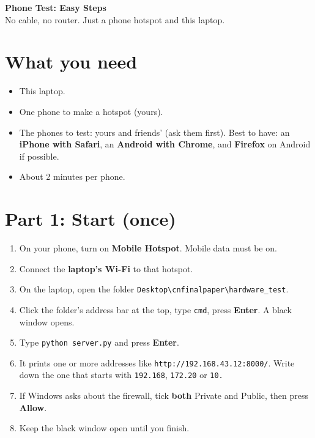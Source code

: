 \documentclass[11pt,a4paper]{article}
\begin{document}
\begin{center}
{\LARGE\bfseries Phone Test: Easy Steps}\\[4pt]
{\large No cable, no router. Just a phone hotspot and this laptop.}
\end{center}

\section*{What you need}
\begin{itemize}
\item This laptop.
\item One phone to make a hotspot (yours).
\item The phones to test: yours and friends' (ask them first). Best to have: an \textbf{iPhone with Safari}, an \textbf{Android with Chrome}, and \textbf{Firefox} on Android if possible.
\item About 2 minutes per phone.
\end{itemize}

\section*{Part 1: Start (once)}
\begin{enumerate}
\item On your phone, turn on \textbf{Mobile Hotspot}. Mobile data must be on.
\item Connect the \textbf{laptop's Wi-Fi} to that hotspot.
\item On the laptop, open the folder \texttt{Desktop\textbackslash cnfinalpaper\textbackslash hardware\_test}.
\item Click the folder's address bar at the top, type \texttt{cmd}, press \textbf{Enter}. A black window opens.
\item Type \texttt{python server.py} and press \textbf{Enter}.
\item It prints one or more addresses like \texttt{http://192.168.43.12:8000/}. Write down the one that starts with \texttt{192.168}, \texttt{172.20} or \texttt{10.}
\item If Windows asks about the firewall, tick \textbf{both} Private and Public, then press \textbf{Allow}.
\item Keep the black window open until you finish.
\end{enumerate}
\end{document}
